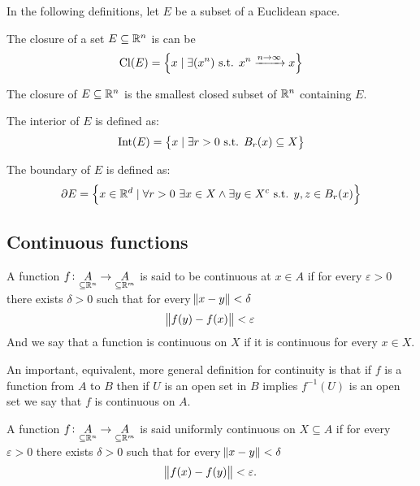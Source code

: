 \documentclass[11pt,a4paper]{article}
\begin{document}
In the following definitions, let $E$ be a subset of a Euclidean space.

\begin{definition}[Closure]
  The closure of a set $E \subseteq \mathbb{R}^n$ is can be 
  \[
    \mathrm{Cl}(E) = \set{x \mid \exists (x^n) \text{ s.t. }x^n \xrightarrow{n\to\infty} x}
  \]
\end{definition}

\begin{proposition}
  The closure of $E \subseteq \mathbb{R}^n$ is the smallest closed subset
  of $\mathbb{R}^n$ containing $E$.
\end{proposition}

\begin{definition}[Interior]
  The interior of $E$ is defined as:
  \[
    \operatorname{Int}(E) = \set{x \mid \exists r > 0 \text{ s.t. }B_r(x) \subseteq X}
  \]
\end{definition}

\begin{definition}[Boundary]
  The boundary of $E$ is defined as:
  \[
    \partial E = \set{x \in \mathbb{R}^d \mid \forall r > 0 \
    \exists x \in X \land \exists y \in X^c \text{ s.t. }y,z\in B_r(x)}
  \]
\end{definition}

\subsection{Continuous functions}

\begin{definition}
  A function 
  $f \colon \underset{\subseteq \mathbb{R}^n}{A} \to \underset{\subseteq \mathbb{R}^m}{A}$ 
  is said to be continuous at $x \in A$ if for every $\varepsilon > 0$
  there exists $\delta > 0$ such that for every $\norm{x - y} < \delta$
  \[
    \norm{f(y) - f(x)} < \varepsilon
  \]
  And we say that a function is continuous on $X$ if it is continuous
  for every $x \in X$.
\end{definition}

An important, equivalent, more general definition for continuity is that
if $f$ is a function from $A$ to $B$ then if $U$ is an open set in $B$
implies $f^{-1}(U)$ is an open set we say that $f$ is continuous on $A$.

\begin{definition}
  A function 
  $f \colon \underset{\subseteq \mathbb{R}^n}{A} \to \underset{\subseteq \mathbb{R}^m}{A}$ 
  is said uniformly continuous on $X \subseteq A$ if for every 
  $\varepsilon > 0$ there exists $\delta > 0$ such that for every 
  $\norm{x - y} < \delta$
  \[
    \norm{f(x) - f(y)} < \varepsilon.
  \]
\end{definition}
\end{document}
